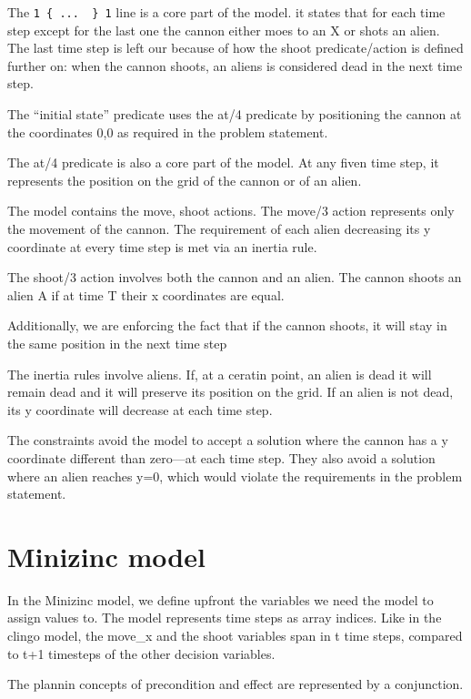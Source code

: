 \documentclass[11pt]{article}
\begin{document}
The \verb|1 { ...  } 1| line is a core part of the model.
it states that for each time step except for the last one the cannon either moes to an X or shots an alien.
The last time step is left our because of how the shoot predicate/action is defined further on: when the cannon shoots, an aliens is considered dead in the next time step.

The ``initial state'' predicate uses the at/4 predicate by positioning the cannon at the coordinates 0,0 as required in the problem statement.

The at/4 predicate is also a core part of the model. At any fiven time step, it represents the position on the grid of the cannon or of an alien.

The model contains the move, shoot actions. The move/3 action represents only the movement of the cannon. The requirement of each alien decreasing its y coordinate at every time step is met via an inertia rule.

The shoot/3 action involves both the cannon and an alien. The cannon shoots an alien A if at time T their x coordinates are equal.

Additionally, we are enforcing the fact that if the cannon shoots, it will stay in the same position in the next time step

The inertia rules involve aliens. If, at a ceratin point, an alien is dead it will remain dead and it will preserve its position on the grid. If an alien is not dead, its y coordinate will decrease at each time step.

The constraints avoid the model to accept a solution where the cannon has a y coordinate different than zero---at each time step. They also avoid a solution where an alien reaches y=0, which would violate the requirements in the problem statement.



\section{Minizinc model}

In the Minizinc model, we define upfront the variables we need the model to assign values to. The model represents time steps as array indices. Like in the clingo model, the move\_x and the shoot variables span in t time steps, compared to t+1 timesteps of the other decision variables.

The plannin concepts of precondition and effect are represented by a conjunction.
\end{document}
